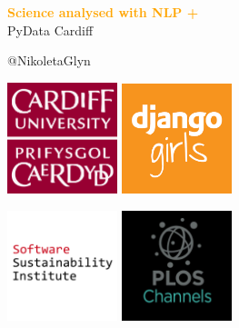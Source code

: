 \documentclass{beamer}
\begin{document}
\begin{frame}
    \begin{center}
        \LARGE{\textbf{\textcolor{orange}{Science analysed with NLP +}}} \\

        \vspace{1.5cm}
        \normalsize{PyData Cardiff}

        \vspace{1cm}
        \normalsize{@NikoletaGlyn}

    \end{center}
\end{frame}

\begin{frame}
    \begin{center}
    \includegraphics[width=0.24\textwidth]{static/cardiff_uni_logo.png}\hspace{6pt}
    \includegraphics[width=0.24\textwidth, height=0.245\textwidth]{static/django_girls.png}\vspace{10pt}

    \includegraphics[width=0.24\textwidth]{static/ssi-logo.png} \hspace{6pt}
    \includegraphics[width=0.24\textwidth]{static/plos-logo.jpg}

    \end{center}
\end{frame}
\end{document}
